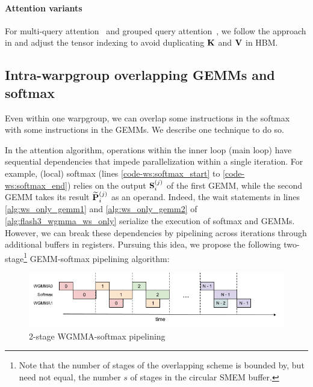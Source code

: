 \paragraph{Attention variants}
For multi-query attention~\citep{shazeer2019fast} and grouped query
attention~\citep{ainslie2023gqa}, we follow the approach in \faa and adjust the
tensor indexing to avoid duplicating $\mathbf{K}$ and $\mathbf{V}$ in HBM.

\subsection{Intra-warpgroup overlapping GEMMs and softmax}


Even within one warpgroup, we can overlap some instructions in the softmax with
some instructions in the GEMMs. We describe one technique to do so.

In the attention algorithm, operations within the inner loop (main loop) have sequential dependencies that impede parallelization within a single iteration.
For example, (local) softmax (lines \ref{code-ws:softmax_start} to \ref{code-ws:softmax_end}) relies on the output $\mathbf{S}_i^{(j)}$ of the first GEMM, while the second GEMM takes its result $\widetilde{\mathbf{P}}_i^{(j)}$ as an operand.
Indeed, the wait statements in lines \ref{alg:ws_only_gemm1} and \ref{alg:ws_only_gemm2} of \cref{alg:flash3_wgmma_ws_only} serialize the execution of softmax and GEMMs.
However, we can break these dependencies by pipelining across iterations through additional buffers in registers.
Pursuing this idea, we propose the following two-stage\footnote{Note that the number of stages of the overlapping scheme is bounded by, but need not equal, the number $s$ of stages in the circular SMEM buffer.} GEMM-softmax pipelining algorithm:

\begin{figure}[ht]
    \centering
    \includegraphics[width=.95\linewidth]{figs/2_stage_pipelining.png}
    \caption{2-stage WGMMA-softmax pipelining}
    \label{fig:2_stage_pipelining}
\end{figure}

